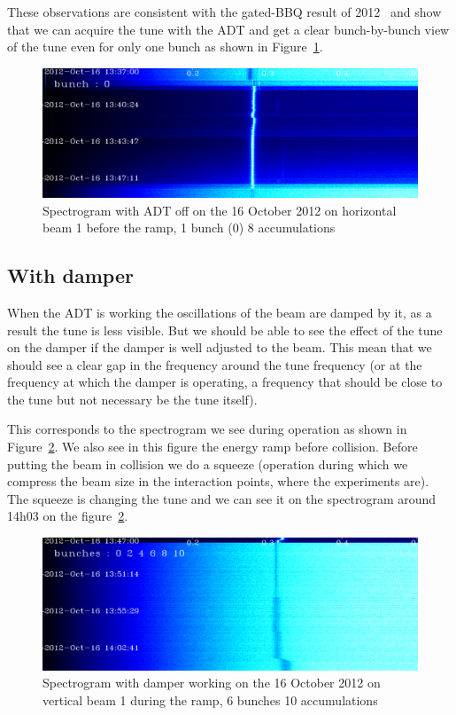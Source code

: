 These observations are consistent with the gated-\gls{BBQ} result of 2012~\cite{Valuch12} and show that we can acquire the tune with the \gls{ADT} and get a clear bunch-by-bunch view of the tune even for only one bunch as shown in Figure~\ref{fig:bunch_0_adt_off}.

\begin{figure}[H]
\caption{Spectrogram with ADT off on the 16 October 2012 on horizontal beam 1 before the ramp, 1 bunch (0) 8 accumulations}
\label{fig:bunch_0_adt_off}
\centering
\includegraphics[scale=0.3]{md-121016-hb1-m1-bunch000001-8acc-1337-1349.pdf}
\end{figure}

\subsection{With damper}

When the \gls{ADT} is working the oscillations of the beam are damped by it, as a result the tune is less visible. But we should be able to see the effect of the tune on the damper if the damper is well adjusted to the beam. This mean that we should see a clear gap in the frequency around the tune frequency (or at the frequency at which the damper is operating, a frequency that should be close to the tune but not necessary be the tune itself).

This corresponds to the spectrogram we see during operation as shown in Figure~\ref{fig:ramp}. We also see in this figure the energy ramp before collision. Before putting the beam in collision we do a squeeze (operation during which we compress the beam size in the interaction points, where the experiments are). The squeeze is changing the tune and we can see it on the spectrogram around 14h03 on the figure~\ref{fig:ramp}.

\begin{figure}[H]
\caption{Spectrogram with damper working on the 16 October 2012 on vertical beam 1 during the ramp, 6 bunches 10 accumulations}
\centering
\label{fig:ramp}
\includegraphics[scale=0.3]{md-121016-vb1-m1-6bunches-10acc-1347-1405-ramp.pdf}
\end{figure}

